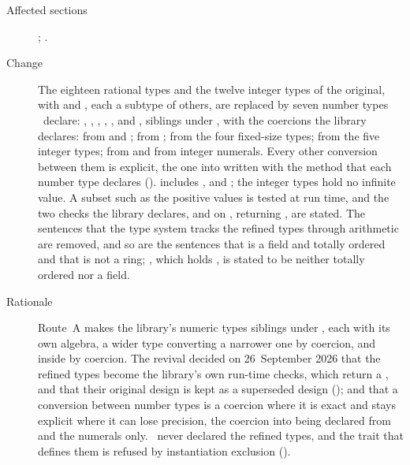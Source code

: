 \begin{description}
\item[Affected sections] ; .
\item[Change] The eighteen rational types and the twelve integer types of the
original, with  and , each a subtype of others,
are replaced by seven number types \library\ declare: ,
, , , ,
 and , siblings under , with the
coercions the library declares:  from  and
;  from ; 
from the four fixed-size types;  from the five integer types;
 from  and from integer numerals.
Every other conversion between them is explicit, the one into  written  with the method that each number type declares ().
 includes \EXP{+\infty}, \EXP{-\infty} and ; the integer
types hold no infinite value.
A subset such as the positive values is tested at run time, and the two checks
the library declares,  and  on ,
returning , are stated.
The sentences that the type system tracks the refined types through arithmetic
are removed, and so are the sentences that  is a field and totally
ordered and that  is not a ring; , which holds
, is stated to be neither totally ordered nor a field.
\item[Rationale] Route~A makes the library's numeric types siblings under
, each with its own algebra, a wider type converting a narrower one
by coercion, and  inside  by coercion.
The revival decided on 26~September 2026 that the refined types become the
library's own run-time checks, which return a , and that their
original design is kept as a superseded design ();
and that a conversion between number types is a coercion where it is exact and
stays explicit where it can lose precision, the coercion into
 being declared from  and the numerals only.
\Library\ never declared the refined types, and the trait that defines them is
refused by instantiation exclusion ().

\end{description}
